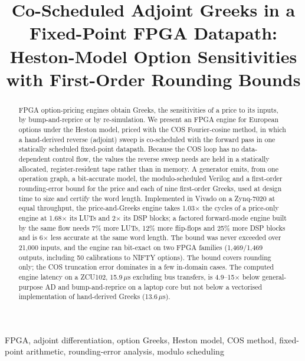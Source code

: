 \documentclass[conference]{IEEEtran}
\newcommand{\SIMDUS}{13.6}
\begin{document}
\title{Co-Scheduled Adjoint Greeks in a Fixed-Point FPGA Datapath:\\ Heston-Model Option Sensitivities with First-Order Rounding Bounds}

\author{
\and
{}
}

\maketitle
\begin{abstract}
FPGA option-pricing engines obtain Greeks, the sensitivities of a price to its inputs, by
bump-and-reprice or by re-simulation. We present an FPGA engine for European options under the
Heston model, priced with the COS Fourier-cosine method, in which a hand-derived reverse (adjoint)
sweep is co-scheduled with the forward pass in one statically scheduled fixed-point datapath.
Because the COS loop has no data-dependent control flow, the values the reverse sweep needs are
held in a statically allocated, register-resident tape rather than in memory. A generator emits,
from one operation graph, a bit-accurate model, the modulo-scheduled Verilog and a first-order
rounding-error bound for the price and each of nine first-order Greeks, used at design time to
size and certify the word length. Implemented in Vivado on a Zynq-7020 at equal throughput, the
price-and-Greeks engine takes 1.03$\times$ the cycles of a price-only engine at 1.68$\times$ its
LUTs and 2$\times$ its DSP blocks; a factored forward-mode engine built by the same flow needs 7\%
more LUTs, 12\% more flip-flops and 25\% more DSP blocks and is 6$\times$ less accurate at the same
word length. The bound was never exceeded over 21,000 inputs, and the engine ran bit-exact on two
FPGA families (1,469/1,469 outputs, including 50 calibrations to NIFTY options). The bound covers
rounding only; the COS truncation error dominates in a few in-domain cases. The computed engine
latency on a ZCU102, 15.9\,$\mu$s excluding bus transfers, is 4.9--15$\times$ below
general-purpose AD and bump-and-reprice on a laptop core but not below a vectorised implementation
of hand-derived Greeks (\SIMDUS\,$\mu$s).
\end{abstract}

\begin{IEEEkeywords}
FPGA, adjoint differentiation, option Greeks, Heston model, COS method, fixed-point arithmetic,
rounding-error analysis, modulo scheduling
\end{IEEEkeywords}
\end{document}
